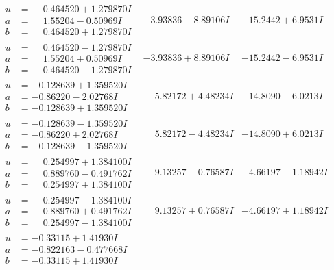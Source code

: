 \documentclass[1p]{elsarticle_modified}
\theoremstyle{definition}
\begin{document}
$$\begin{array}{c|c|c}
\begin{aligned}
u &= \phantom{-}0.464520 + 1.279870 I \\
a &= \phantom{-}1.55204 - 0.50969 I \\
b &= \phantom{-}0.464520 + 1.279870 I\end{aligned}
 & -3.93836 - 8.89106 I & -15.2442 + 6.9531 I \\ \hline\begin{aligned}
u &= \phantom{-}0.464520 - 1.279870 I \\
a &= \phantom{-}1.55204 + 0.50969 I \\
b &= \phantom{-}0.464520 - 1.279870 I\end{aligned}
 & -3.93836 + 8.89106 I & -15.2442 - 6.9531 I \\ \hline\begin{aligned}
u &= -0.128639 + 1.359520 I \\
a &= -0.86220 - 2.02768 I \\
b &= -0.128639 + 1.359520 I\end{aligned}
 & \phantom{-}5.82172 + 4.48234 I & -14.8090 - 6.0213 I \\ \hline\begin{aligned}
u &= -0.128639 - 1.359520 I \\
a &= -0.86220 + 2.02768 I \\
b &= -0.128639 - 1.359520 I\end{aligned}
 & \phantom{-}5.82172 - 4.48234 I & -14.8090 + 6.0213 I \\ \hline\begin{aligned}
u &= \phantom{-}0.254997 + 1.384100 I \\
a &= \phantom{-}0.889760 - 0.491762 I \\
b &= \phantom{-}0.254997 + 1.384100 I\end{aligned}
 & \phantom{-}9.13257 - 0.76587 I & -4.66197 - 1.18942 I \\ \hline\begin{aligned}
u &= \phantom{-}0.254997 - 1.384100 I \\
a &= \phantom{-}0.889760 + 0.491762 I \\
b &= \phantom{-}0.254997 - 1.384100 I\end{aligned}
 & \phantom{-}9.13257 + 0.76587 I & -4.66197 + 1.18942 I \\ \hline\begin{aligned}
u &= -0.33115 + 1.41930 I \\
a &= -0.822163 - 0.477668 I \\
b &= -0.33115 + 1.41930 I\end{aligned}

\end{array}$$
\end{document}
